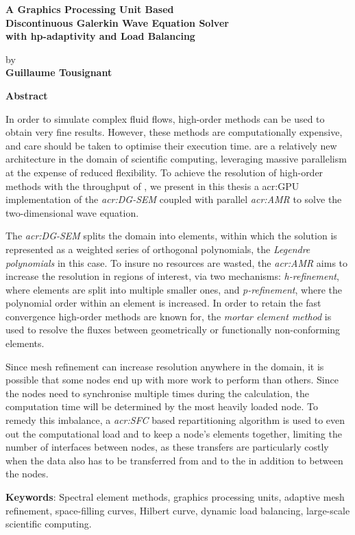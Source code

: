 \thispagestyle{plain} %

\begin{center}
	\vspace*{0.5cm} %
	{ \Large
		\textbf{A Graphics Processing Unit Based \\ 
			Discontinuous Galerkin Wave Equation Solver \\
			with hp-adaptivity and Load Balancing \\
		}
	}
	\vspace{0.4cm}
	\large

	by \\
	\vspace{0.4cm}
	\textbf{Guillaume Tousignant}
	
	\vspace{0.9cm}
	\textbf{Abstract}
	
\end{center}

In order to simulate complex fluid flows, high-order methods can be used to obtain very fine
results. However, these methods are computationally expensive, and care should be taken to optimise
their execution time. \textit{} are a relatively new architecture in the domain
of scientific computing, leveraging massive parallelism at the expense of reduced flexibility. To
achieve the resolution of high-order methods with the throughput of , we present
in this thesis a \acrshort{acr:GPU} implementation of the \textit{\acrfull{acr:DG-SEM}} coupled with
parallel \textit{\acrfull{acr:AMR}} to solve the two-dimensional wave equation. 

The \textit{\acrlong{acr:DG-SEM}} splits the domain into elements,  within which the solution is
represented as a weighted series of orthogonal polynomials, the \textit{Legendre polynomials} in
this case. To insure no resources are wasted, the \textit{\acrlong{acr:AMR}} aims to increase the
resolution in regions of interest, via two mechanisms: \textit{h-refinement}, where elements are
split into multiple smaller ones, and \textit{p-refinement}, where the polynomial order within an
element is increased. In order to retain the fast convergence high-order methods are known for, the
\textit{mortar element method} is used to resolve the fluxes between geometrically or functionally
non-conforming elements.

Since mesh refinement can increase resolution anywhere in the domain, it is possible that some nodes
end up with more work to perform than others. Since the nodes need to synchronise multiple times
during the calculation, the computation time will be determined by the most heavily loaded node. To
remedy this imbalance, a \textit{\acrfull{acr:SFC}} based repartitioning algorithm is used to even
out the computational load and to keep a node's elements together, limiting the number of interfaces
between nodes, as these transfers are particularly costly when the data also has to be  transferred
from and to the  in addition to between the nodes.


\textbf{Keywords}: Spectral element methods, graphics processing units, adaptive mesh refinement, space-filling curves, Hilbert curve, dynamic load balancing, large-scale scientific computing.

 